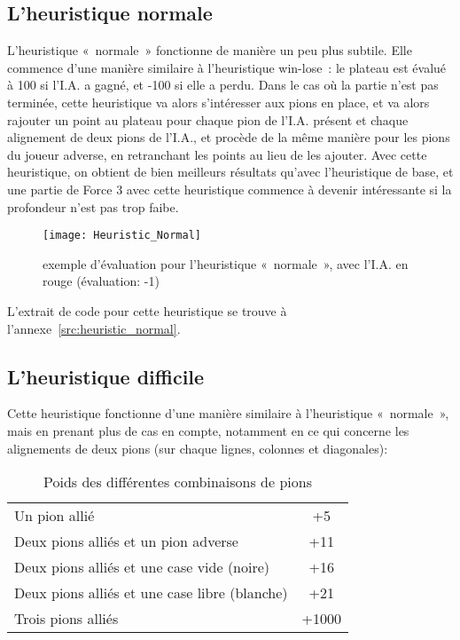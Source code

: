 \subsection{L'heuristique normale}

L'heuristique « normale » fonctionne de manière un peu plus subtile. Elle commence d'une manière similaire
à l'heuristique win-lose : le plateau est évalué à 100 si l'I.A. a gagné, et -100 si elle a perdu.
Dans le cas où la partie n'est pas terminée, cette heuristique va alors s'intéresser aux pions en place,
et va alors rajouter un point au plateau pour chaque pion de l'I.A. présent et chaque alignement de deux
pions de l'I.A., et procède de la même manière pour les pions du joueur adverse, en retranchant les points
au lieu de les ajouter. Avec cette heuristique, on obtient de bien meilleurs résultats qu'avec l'heuristique
de base, et une partie de Force 3 avec cette heuristique commence à devenir intéressante si la
profondeur n'est pas trop faibe.

\begin{figure}[H]
    \centering
    \texttt{[image: Heuristic\_Normal]}{}
    \caption{exemple d'évaluation pour l'heuristique « normale », avec l'I.A. en rouge (évaluation: -1)}
\end{figure}

L'extrait de code pour cette heuristique se trouve à l'annexe \ref{src:heuristic_normal}.

\subsection{L'heuristique difficile}

Cette heuristique fonctionne d'une manière similaire à l'heuristique « normale », mais en prenant plus de
cas en compte, notamment en ce qui concerne les alignements de deux pions (sur chaque lignes, colonnes et diagonales):

\begin{table}[H]
    \begin{tabular}{lc}
        Un pion allié                                 & +5    \\
        Deux pions alliés et un pion adverse          & +11   \\
        Deux pions alliés et une case vide (noire)    & +16   \\
        Deux pions alliés et une case libre (blanche) & +21   \\
        Trois pions alliés                            & +1000 \\
    \end{tabular}
    \caption{Poids des différentes combinaisons de pions}
\end{table}

